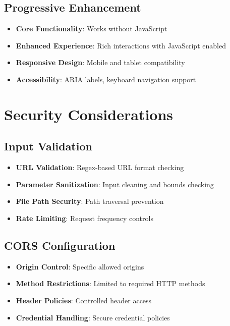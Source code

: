 \subsection{Progressive Enhancement}
\label{subsec:progressive-enhancement}

\begin{itemize}
    \item \textbf{Core Functionality}: Works without JavaScript
    \item \textbf{Enhanced Experience}: Rich interactions with JavaScript enabled
    \item \textbf{Responsive Design}: Mobile and tablet compatibility
    \item \textbf{Accessibility}: ARIA labels, keyboard navigation support
\end{itemize}

\section{Security Considerations}
\label{sec:security-considerations}

\subsection{Input Validation}
\label{subsec:input-validation}

\begin{itemize}
    \item \textbf{URL Validation}: Regex-based URL format checking
    \item \textbf{Parameter Sanitization}: Input cleaning and bounds checking
    \item \textbf{File Path Security}: Path traversal prevention
    \item \textbf{Rate Limiting}: Request frequency controls
\end{itemize}

\subsection{CORS Configuration}
\label{subsec:cors-configuration}

\begin{itemize}
    \item \textbf{Origin Control}: Specific allowed origins
    \item \textbf{Method Restrictions}: Limited to required HTTP methods
    \item \textbf{Header Policies}: Controlled header access
    \item \textbf{Credential Handling}: Secure credential policies
\end{itemize}

